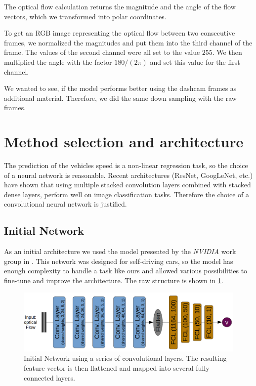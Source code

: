 \documentclass[conference]{IEEEtran}
\begin{document}
The optical flow calculation returns the magnitude and
the angle of the flow vectors, which we transformed into polar 
coordinates.

To get an RGB image representing the
optical flow between two consecutive frames, we normalized the magnitudes and put them into the third channel 
of the frame. The values
of the second channel were all set to the value $255$. We then multiplied the angle with the factor 
$180/(2\pi)$ and set this value 
for the first channel.

We wanted to see, if the model performs better using the dashcam frames as additional material. 
Therefore, we did the same down sampling with the raw frames.

\section{Method selection and architecture}
The prediction of the vehicles speed is a non-linear regression task, so the choice of a neural network 
is reasonable. Recent architectures (ResNet, GoogLeNet, etc.) have shown that using multiple stacked 
convolution layers combined with stacked dense layers, perform well on image classification tasks. 
Therefore the choice of a convolutional neural network is justified.

\subsection{Initial Network}
As an initial architecture we used the model presented by the \emph{NVIDIA} work group in 
\cite{NVIDIA2016}. This network was designed for self-driving cars, so the model has enough complexity 
to handle a task like ours and allowed various possibilities to fine-tune and improve the architecture. 
The raw structure is shown in \cref{fig:initialNetwork}.
\begin{figure}[ht]
	\centering
	\includegraphics[width=0.9\columnwidth]{imgs/InitialNetwork.png}
	\caption{Initial Network using a series of convolutional layers. The resulting feature vector is 
	then flattened and mapped into several fully connected layers.}
	\label{fig:initialNetwork}
\end{figure}
\end{document}
